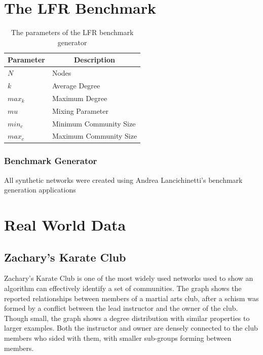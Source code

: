 \section{The LFR Benchmark}

\begin{table}[h!]
	\centering
	\begin{tabular}{ |l | l| } 
		\hline
		\multicolumn{1}{|c|}{\textbf{Parameter}} & \multicolumn{1}{|c|}{\textbf{Description}} \\
		\hline
		\hline
		$N$ & Nodes \\ 
		\hline
		$k$ & Average Degree \\ 
		\hline
		$max_k$ & Maximum Degree \\ 
		\hline	
		$mu$ & Mixing Parameter \\ 
		\hline
		$min_c$ & Minimum Community Size \\
		\hline
		$max_c$ & Maximum Community Size \\ 
		\hline
	\end{tabular}
		\caption{The parameters of the LFR benchmark generator}
		\label{table:lfrparams}
\end{table}

\cite{Lancichinetti2008}


\subsubsection{Benchmark Generator}
All synthetic networks were created using Andrea Lancichinetti's benchmark generation applications 

\section{Real World Data}
\subsection{Zachary's Karate Club}
Zachary's Karate Club \cite{Zachary1977} is one of the most widely used networks used to show an algorithm can effectively identify a set of communities. The graph shows the reported relationships between members of a martial arts club, after a schism was formed by a conflict between the lead instructor and the owner of the club. Though small, the graph shows a degree distribution with similar properties to larger examples. Both the instructor and owner are densely connected to the club members who sided with them, with smaller sub-groups forming between members. 

